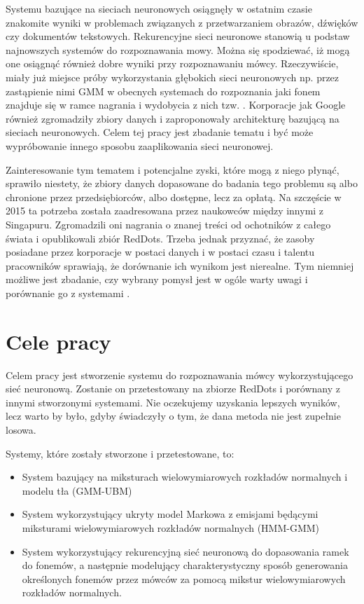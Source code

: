 Systemu bazujące na sieciach neuronowych osiągnęły w ostatnim czasie znakomite wyniki w problemach
związanych z przetwarzaniem obrazów, dźwięków czy dokumentów tekstowych. Rekurencyjne sieci neuronowe
stanowią u podstaw najnowszych systemów do rozpoznawania mowy. Można się spodziewać, iż mogą one
osiągnąć również dobre wyniki przy rozpoznawaniu mówcy. Rzeczywiście, miały już miejsce próby
wykorzystania głębokich sieci neuronowych np. przez zastąpienie nimi GMM w obecnych systemach do rozpoznania 
jaki fonem znajduje się w ramce nagrania i wydobycia z nich tzw. .
Korporacje jak Google również zgromadziły zbiory danych i zaproponowały architekturę bazującą na sieciach
neuronowych. Celem tej pracy jest zbadanie tematu i być może wypróbowanie innego sposobu zaaplikowania
sieci neuronowej.

Zainteresowanie tym tematem i potencjalne zyski, które mogą z niego płynąć, sprawiło niestety, 
że zbiory danych dopasowane do badania tego problemu są albo chronione przez przedsiębiorców, 
albo dostępne, lecz za opłatą. Na szczęście w 2015 ta potrzeba
została zaadresowana przez naukowców między innymi z Singapuru. Zgromadzili oni nagrania o znanej
treści od ochotników z całego świata i opublikowali zbiór RedDots. Trzeba jednak przyznać, że
zasoby posiadane przez korporacje w postaci danych i w postaci czasu i talentu pracowników sprawiają,
że dorównanie ich wynikom jest nierealne. Tym niemniej możliwe jest zbadanie, czy wybrany pomysł
jest w ogóle warty uwagi i porównanie go z systemami .

\section{Cele pracy}\label{sec:cele_pracy}

Celem pracy jest stworzenie systemu do rozpoznawania mówcy wykorzystującego sieć neuronową. 
Zostanie on przetestowany na zbiorze RedDots i porównany z innymi stworzonymi systemami.
Nie oczekujemy uzyskania lepszych wyników, lecz warto by było, gdyby świadczyły o tym,
że dana metoda nie jest zupełnie losowa.

Systemy, które zostały stworzone i przetestowane, to:

\begin{itemize}
  \item System bazujący na miksturach wielowymiarowych rozkładów normalnych i modelu tła (GMM-UBM)
  \item System wykorzystujący ukryty model Markowa z emisjami będącymi miksturami wielowymiarowych rozkładów normalnych (HMM-GMM)
  \item System wykorzystujący rekurencyjną sieć neuronową do dopasowania ramek do fonemów, a następnie modelujący charakterystyczny sposób generowania określonych fonemów przez mówców za pomocą mikstur wielowymiarowych rozkładów normalnych.
\end{itemize}

